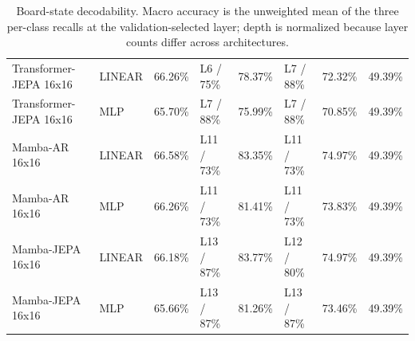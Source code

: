 \begin{table}[t]
\begin{tabular}{llllllll}
Transformer-JEPA 16x16 & LINEAR & 66.26\% & L6 / 75\% & 78.37\% & L7 / 88\% & 72.32\% & 49.39\% \\
Transformer-JEPA 16x16 & MLP & 65.70\% & L7 / 88\% & 75.99\% & L7 / 88\% & 70.85\% & 49.39\% \\
Mamba-AR 16x16 & LINEAR & 66.58\% & L11 / 73\% & 83.35\% & L11 / 73\% & 74.97\% & 49.39\% \\
Mamba-AR 16x16 & MLP & 66.26\% & L11 / 73\% & 81.41\% & L11 / 73\% & 73.83\% & 49.39\% \\
Mamba-JEPA 16x16 & LINEAR & 66.18\% & L13 / 87\% & 83.77\% & L12 / 80\% & 74.97\% & 49.39\% \\
Mamba-JEPA 16x16 & MLP & 65.66\% & L13 / 87\% & 81.26\% & L13 / 87\% & 73.46\% & 49.39\% \\
\bottomrule
\end{tabular}
\caption{Board-state decodability. Macro accuracy is the unweighted mean of the three per-class recalls at the validation-selected layer; depth is normalized because layer counts differ across architectures.}
\label{tab:board}
\end{table}
